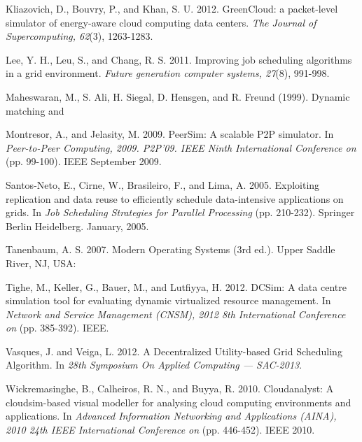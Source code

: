 \documentclass{llncs}
\begin{document}
\begin{thebibliography}{1}
 Kliazovich, D., Bouvry, P., and Khan, S. U. 2012. GreenCloud: a packet-level simulator of energy-aware cloud computing data centers. {\em The Journal of Supercomputing, 62}(3), 1263-1283.

 Lee, Y. H., Leu, S., and Chang, R. S. 2011. Improving job scheduling algorithms in a grid environment. {\em Future generation computer systems, 27}(8), 991-998.

Maheswaran, M., S. Ali, H. Siegal, D. Hensgen, and R. Freund (1999). Dynamic matching and

 Montresor, A., and Jelasity, M. 2009. PeerSim: A scalable P2P simulator. In {\em Peer-to-Peer Computing, 2009. P2P'09. IEEE Ninth International Conference on} (pp. 99-100). IEEE September 2009.

 Santos-Neto, E., Cirne, W., Brasileiro, F., and Lima, A. 2005. Exploiting replication and data reuse to efficiently schedule data-intensive applications on grids. In {\em Job Scheduling Strategies for Parallel Processing} (pp. 210-232). Springer Berlin Heidelberg. January, 2005.

 Tanenbaum, A. S. 2007. Modern Operating Systems (3rd ed.). Upper Saddle River, NJ, USA:

 Tighe, M., Keller, G., Bauer, M., and Lutfiyya, H. 2012. DCSim: A data centre simulation tool for evaluating dynamic virtualized resource management. In {\em Network and Service Management (CNSM), 2012 8th International Conference on} (pp. 385-392). IEEE.

 Vasques, J. and Veiga, L. 2012. A Decentralized Utility-based Grid Scheduling Algorithm. In {\em 28th Symposium On Applied Computing --- SAC-2013}.

 Wickremasinghe, B., Calheiros, R. N., and Buyya, R. 2010. Cloudanalyst: A cloudsim-based visual modeller for analysing cloud computing environments and applications. In {\em Advanced Information Networking and Applications (AINA), 2010 24th IEEE International Conference on} (pp. 446-452). IEEE 2010.


\end{thebibliography}
\end{document}
